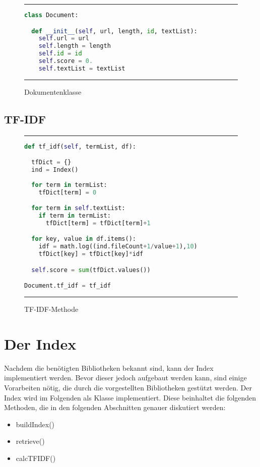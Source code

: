 \begin{figure}[h]
	\rule{\textwidth}{0.4pt}
		\begin{lstlisting}[language=Python]
class Document:

  def __init__(self, url, length, id, textList):
    self.url = url
    self.length = length
    self.id = id
    self.score = 0.
    self.textList = textList
		\end{lstlisting}
	\rule{\textwidth}{0.4pt}
	\caption{Dokumentenklasse}
	\label{fig:document}
\end{figure}

\subsection{TF-IDF}\label{tf-idf}

\begin{figure}[h]
	\rule{\textwidth}{0.4pt}
		\begin{lstlisting}[language=Python]
def tf_idf(self, termList, df):

  tfDict = {}
  ind = Index()
  
  for term in termList:
    tfDict[term] = 0  

  for term in self.textList:
    if term in termList:
      tfDict[term] = tfDict[term]+1

  for key, value in df.items():
    idf = math.log((ind.fileCount+1/value+1),10)
    tfDict[key] = tfDict[key]*idf

  self.score = sum(tfDict.values())

Document.tf_idf = tf_idf
		\end{lstlisting}
	\rule{\textwidth}{0.4pt}
	\caption{TF-IDF-Methode}
	\label{fig:tfidf}
\end{figure}

\section{Der Index}\label{der-index}

Nachdem die benötigten Bibliotheken bekannt sind, kann der Index implementiert werden. Bevor dieser jedoch aufgebaut werden kann, sind einige Vorarbeiten nötig, die durch die vorgestellten Bibliotheken gestützt werden. Der Index wird im Folgenden als Klasse implementiert. Diese beinhaltet die folgenden Methoden, die in den folgenden Abschnitten genauer diskutiert werden:

\begin{itemize}
	\item buildIndex()
	\item retrieve()
	\item calcTFIDF()
\end{itemize}

